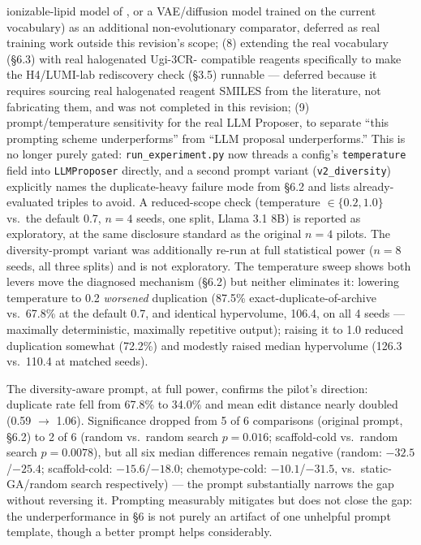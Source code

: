\documentclass{article}
\begin{document}
ionizable-lipid model of \citet{zhu2024generative}, or a VAE/diffusion
model trained on the current vocabulary) as an additional non-evolutionary
comparator, deferred as real training work outside this revision's scope;
(8) extending the real vocabulary (\S6.3) with real halogenated Ugi-3CR-
compatible reagents specifically to make the H4/LUMI-lab rediscovery
check (\S3.5) runnable --- deferred because it requires sourcing real
halogenated reagent SMILES from the literature, not fabricating them, and
was not completed in this revision; (9) prompt/temperature sensitivity
for the real LLM Proposer, to separate ``this prompting scheme
underperforms'' from ``LLM proposal underperforms.'' This is no longer
purely gated: \texttt{run\_experiment.py} now threads a config's
\texttt{temperature} field into \texttt{LLMProposer} directly, and a
second prompt variant (\texttt{v2\_diversity}) explicitly names the
duplicate-heavy failure mode from \S6.2 and lists already-evaluated
triples to avoid. A reduced-scope check (temperature $\in
\{0.2,1.0\}$ vs.\ the default 0.7, $n=4$ seeds, one split, Llama 3.1 8B) is
reported as exploratory, at the same disclosure standard as the original
$n=4$ pilots. The diversity-prompt variant was additionally re-run at full
statistical power ($n=8$ seeds, all three splits) and is not exploratory.
The temperature sweep shows both levers move the diagnosed mechanism
(\S6.2) but neither eliminates it: lowering temperature to 0.2
\emph{worsened} duplication (87.5\% exact-duplicate-of-archive vs.\ 67.8\%
at the default 0.7, and identical hypervolume, 106.4, on all 4 seeds ---
maximally deterministic, maximally repetitive output); raising it to 1.0
reduced duplication somewhat (72.2\%) and modestly raised median
hypervolume (126.3 vs.\ 110.4 at matched seeds).

The diversity-aware prompt, at full power, confirms the pilot's direction:
duplicate rate fell from 67.8\% to 34.0\% and mean edit distance nearly
doubled (0.59 $\to$ 1.06). Significance dropped from 5 of 6 comparisons
(original prompt, \S6.2) to 2 of 6 (random vs.\ random search
$p=0.016$; scaffold-cold vs.\ random search $p=0.0078$), but all six
median differences remain negative (random: $-32.5$/$-25.4$;
scaffold-cold: $-15.6$/$-18.0$; chemotype-cold: $-10.1$/$-31.5$, vs.\
static-GA/random search respectively) --- the prompt substantially
narrows the gap without reversing it. Prompting measurably mitigates but
does not close the gap: the underperformance in \S6 is not purely an
artifact of one unhelpful prompt template, though a better prompt helps
considerably.
\end{document}
